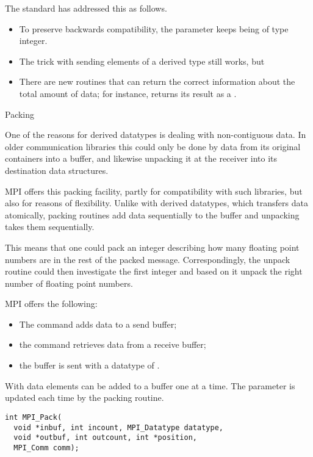 The  standard has addressed this
as follows.
\begin{itemize}
\item To preserve backwards compatibility, the  parameter keeps
  being of type integer.
\item The trick with sending elements of a derived type still works, but
\item There are new routines that can return the correct information about the
  total amount of data; for instance, 
  returns its result as a .
\end{itemize}


 {Packing}
\label{sec:pack}

One of the reasons for derived datatypes is dealing with non-contiguous data.
In older communication libraries this could only be done by  data
from its original containers into a buffer, and likewise unpacking it at the
receiver into its destination data structures.

MPI offers this packing facility, partly for compatibility with such libraries,
but also for reasons of flexibility. Unlike with derived datatypes,
which transfers data atomically, packing routines add data sequentially
to the buffer and unpacking takes them sequentially. 

This means that 
one could pack an integer describing how many floating point numbers
are in the rest of the packed message. 
Correspondingly, the unpack routine could then investigate the first integer
and based on it unpack the right number of floating point numbers.

MPI offers the following:
\begin{itemize}
\item The  command adds data to a send buffer;
\item the  command retrieves data from a receive buffer;
\item the buffer is sent with a datatype of .
\end{itemize}

With  data elements can be added 
to a buffer one at a time. The  parameter is updated
each time by the packing routine.
\begin{lstlisting}
int MPI_Pack(
  void *inbuf, int incount, MPI_Datatype datatype,
  void *outbuf, int outcount, int *position,
  MPI_Comm comm);
\end{lstlisting}

